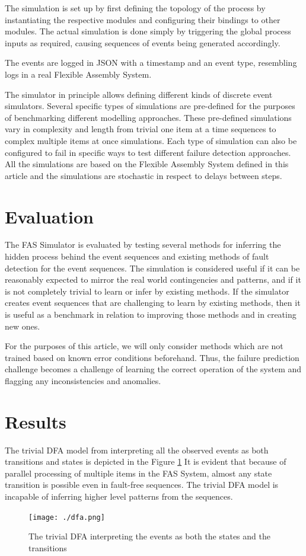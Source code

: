 \documentclass[journal]{IEEEtran}
\begin{document}
The simulation is set up by first defining the topology of the process by instantiating the respective modules and configuring their bindings to other modules. The actual simulation
is done simply by triggering the global process inputs as required, causing sequences of events being generated accordingly.

The events are logged in JSON with a timestamp and an event type, resembling logs in a real Flexible Assembly System.

The simulator in principle allows defining different kinds of discrete event simulators. Several specific types of simulations are pre-defined for the purposes of benchmarking
different modelling approaches. These pre-defined simulations vary in complexity and length from trivial one item at a time sequences to complex multiple items at once simulations.
Each type of simulation can also be configured to fail in specific ways to test different failure detection approaches. All the simulations are based on the Flexible Assembly System
defined in this article and the simulations are stochastic in respect to delays between steps.

\section{Evaluation}

The FAS Simulator is evaluated by testing several methods for inferring the hidden process behind the event sequences and existing methods of fault detection for
the event sequences.
The simulation is considered useful if it can be reasonably expected to mirror the real world contingencies and patterns, and if it is not completely trivial to
learn or infer by existing methods. If the simulator creates event sequences that are challenging to learn by existing methods, then it is useful as a benchmark
in relation to improving those methods and in creating new ones.

For the purposes of this article, we will only consider methods which are not trained based on known error conditions beforehand. Thus, the failure prediction challenge
becomes a challenge of learning the correct operation of the system and flagging any inconsistencies and anomalies.

\section{Results}

The trivial DFA model from interpreting all the observed events as both transitions and states is depicted in the Figure \ref{figure:trivial_DFA}
It is evident that because of parallel processing of multiple items in the FAS System, almost any state transition is
possible even in fault-free sequences. The trivial DFA model is incapable of inferring higher level patterns from the sequences.
\begin{figure}[tb]
 \centering
 \texttt{[image: ./dfa.png]}
 \caption{The trivial DFA interpreting the events as both the states and the transitions}
 \label{figure:trivial_DFA}
\end{figure}
\end{document}
